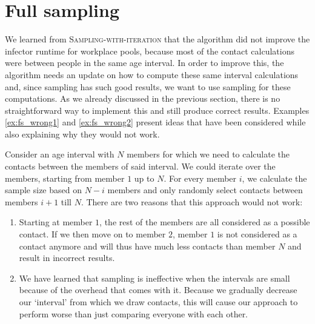 \section{Full sampling}
\label{sec:full_sampling}
We learned from \textsc{Sampling-with-iteration} that the algorithm did not improve the infector runtime for workplace pools, because most of the contact calculations were between people in the same age interval. In order to improve this, the algorithm needs an update on how to compute these same interval calculations and, since sampling has such good results, we want to use sampling for these computations. As we already discussed in the previous section, there is no straightforward way to implement this and still produce correct results. Examples \ref{ex:fs_wrong1} and \ref{ex:fs_wrong2} present ideas that have been considered while also explaining why they would not work.
\begin{example}
\label{ex:fs_wrong1}
Consider an age interval with $N$ members for which we need to calculate the contacts between the members of said interval. We could iterate over the members, starting from member $1$ up to $N$. For every member $i$, we calculate the sample size based on $N-i$ members and only randomly select contacts between members $i+1$ till $N$. There are two reasons that this approach would not work:
\begin{enumerate}
    \item Starting at member $1$, the rest of the members are all considered as a possible contact. If we then move on to member $2$, member $1$ is not considered as a contact anymore and will thus have much less contacts than member $N$ and result in incorrect results.
    \item We have learned that sampling is ineffective when the intervals are small because of the overhead that comes with it. Because we gradually decrease our `interval' from which we draw contacts, this will cause our approach to perform worse than just comparing everyone with each other.
\end{enumerate}
\end{example}

